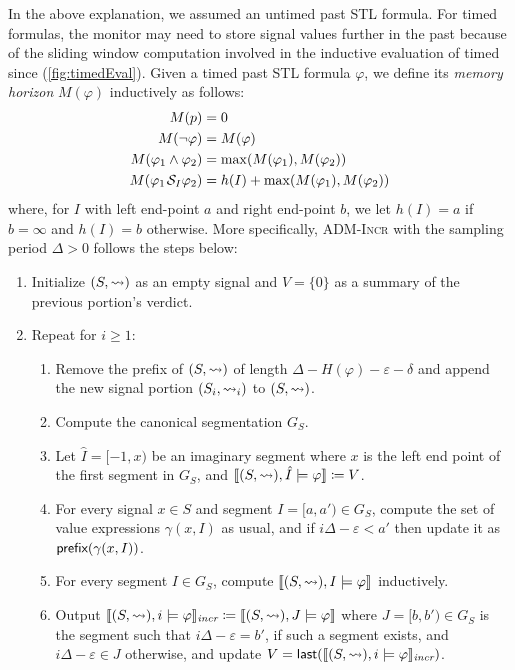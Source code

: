 In the above explanation, we assumed an untimed past STL formula.
For timed formulas, the monitor may need to store signal values further in the past because of the sliding window computation involved in the inductive evaluation of timed since (\cref{fig:timedEval}).
Given a timed past STL formula $\varphi$, we define its \emph{memory horizon} $M(\varphi)$ inductively as follows:
\begin{align*}
	M(p) &= 0 \\
	M(\lnot \varphi) &= M(\varphi) \\
	M(\varphi_1 \land \varphi_2) &= \max(M(\varphi_1), M(\varphi_2))\\
	M(\varphi_1 \kern.1em\mathcal{S}_I \varphi_2) &= h(I) + \max(M(\varphi_1), M(\varphi_2))
\end{align*}
where, for $I$ with left end-point $a$ and right end-point $b$, we let $h(I) = a$ if $b = \infty$ and $h(I) = b$ otherwise.
More specifically, \textsc{ADM-Incr} with the sampling period $\Delta > 0$ follows the steps below:
\begin{enumerate}[label*=\arabic*.]
	\item Initialize $(S,{\rightsquigarrow})$ as an empty signal and $V = \{0\}$ as a summary of the previous portion's verdict.
	\item Repeat for $i \geq 1$:
	\begin{enumerate}[leftmargin=5pt,label*=\arabic*]
		\item Remove the prefix of $(S,{\rightsquigarrow})$ of length $\Delta - H(\varphi) - \varepsilon - \delta$  and append the new signal portion $(S_i,{\rightsquigarrow}_i)$ to $(S,{\rightsquigarrow})$.
		\item Compute the canonical segmentation $G_S$.
		\item Let $\hat{I} = [-1, x)$ be an imaginary segment where $x$ is the left end point of the first segment in $G_S$, and $\llbracket (S, {\rightsquigarrow}), \hat{I} \models \varphi \rrbracket \coloneqq V$.
		\item For every signal $x \in S$ and segment $I = [a, a') \in G_S$, compute the set of value expressions $\gamma(x,I)$ as usual, and if $i\Delta - \varepsilon < a'$ then update it as $\textsf{prefix}(\gamma(x,I))$.
		\item For every segment $I \in G_S$, compute $\llbracket (S, {\rightsquigarrow}), I \models \varphi \rrbracket$ inductively.
		\item Output $\llbracket (S, {\rightsquigarrow}), i \models \varphi \rrbracket_{\textit{incr}} \coloneqq \llbracket (S, {\rightsquigarrow}), J \models \varphi \rrbracket$ where $J = [b,b') \in G_S$ is the segment such that $i\Delta - \varepsilon = b'$, if such a segment exists, and $i\Delta - \varepsilon \in J$ otherwise, and update $V = \textsf{last}(\llbracket (S, {\rightsquigarrow}), i \models \varphi \rrbracket_{\textit{incr}})$.
	\end{enumerate}
\end{enumerate}

